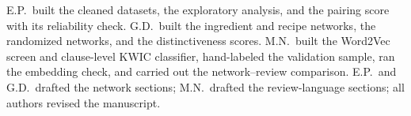 E.P.\ built the cleaned datasets, the exploratory analysis, and the pairing score with its reliability check. G.D.\ built the ingredient and recipe networks, the randomized networks, and the distinctiveness scores. M.N.\ built the Word2Vec screen and clause-level KWIC classifier, hand-labeled the validation sample, ran the embedding check, and carried out the network--review comparison. E.P.\ and G.D.\ drafted the network sections; M.N.\ drafted the review-language sections; all authors revised the manuscript.
